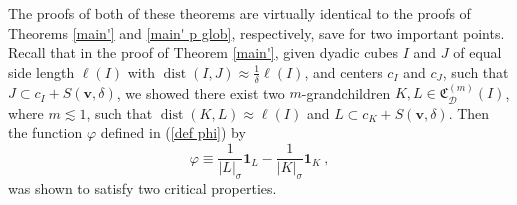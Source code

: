 \documentclass{amsart}%
\theoremstyle{plain}
\numberwithin{equation}{section}
\begin{document}
The proofs of both of these theorems are virtually identical to the proofs of Theorems \ref{main'} and \ref{main' p glob},
respectively, save for two important points. Recall that in the proof of
Theorem \ref{main'}, given dyadic cubes $I$ and $J$ of equal side length $\ell\left(  I\right)  $
with $\operatorname*{dist}\left(  I,J\right)  \approx\frac{1}{\delta}%
\ell\left(  I\right)  $, and centers $c_{I}$ and $c_{J}$, such that $J\subset
c_{I}+S\left(  \mathbf{v},\delta\right)  $, we showed there exist two
$m$-grandchildren $K,L\in\mathfrak{C}_{\mathcal{D}}^{\left(  m\right)
}\left(  I\right)  $, where $m \lesssim 1$, such that $\operatorname*{dist}\left(  K,L\right)
\approx
\ell\left(  I\right)  $ and $L\subset c_{K}+S\left(  \mathbf{v},\delta\right)
$. Then the function $\varphi$ defined in (\ref{def phi}) by%
\begin{equation}
\varphi\equiv\frac{1}{\left\vert L\right\vert _{\sigma}}\mathbf{1}_{L}%
-\frac{1}{\left\vert K\right\vert _{\sigma}}\mathbf{1}_{K}\ , \label{def phi'}%
\end{equation}
was shown to satisfy two critical properties.
\end{document}
